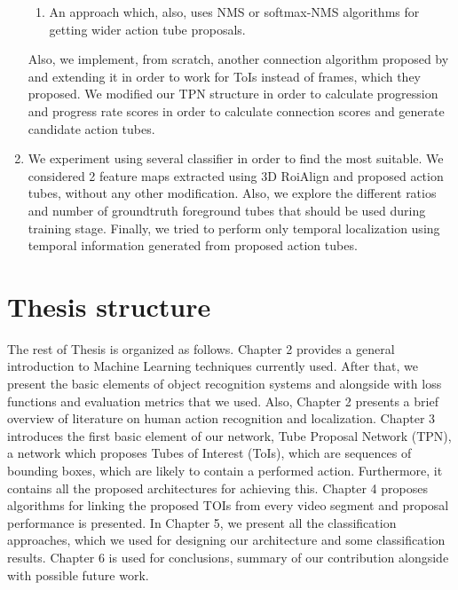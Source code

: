 \begin{enumerate}
\begin{enumerate}
  \item An approach which, also, uses NMS or softmax-NMS algorithms for getting wider action tube proposals.
  \end{enumerate}
  Also, we implement, from scratch, another connection algorithm proposed by \cite{DBLP:journals/corr/abs-1903-00304} and extending it in order to work for ToIs instead of frames, which they proposed.
  We modified our TPN structure in order to calculate progression and progress rate scores in order to calculate connection scores and generate candidate action tubes.
\item We experiment using several classifier in order to find the most suitable. We considered 2 feature maps extracted using 3D RoiAlign and proposed action tubes, without any other
  modification. Also, we explore the different ratios and number of groundtruth foreground tubes that should be used during training
  stage. Finally, we tried to perform only temporal localization using temporal information generated from proposed action tubes.
\end{enumerate}

\section{Thesis structure}
The rest of Thesis is organized as follows. Chapter 2 provides a general introduction to Machine Learning techniques currently used.
After that, we present the basic elements of object recognition systems and alongside with loss functions and evaluation metrics that
we used. Also, Chapter 2 presents a brief overview of literature on human action recognition and localization. Chapter 3 introduces the first basic element of our network, Tube Proposal Network (TPN), a network which proposes Tubes of Interest (ToIs), which are sequences of bounding boxes, which are likely to contain a performed action. Furthermore, it contains all the proposed architectures for achieving this.
Chapter 4 proposes algorithms for linking the proposed TOIs from every video segment and proposal performance is presented.
In Chapter 5, we present all the classification approaches, which we used for designing our architecture and some classification results.
Chapter 6 is used for conclusions, summary of our contribution alongside with possible future work.

% 
